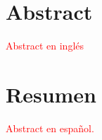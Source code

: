 \thispagestyle{plain}


\vspace{-30pt}
\section*{Abstract}

\textcolor{red}{Abstract en inglés}

\section*{Resumen}

\textcolor{red}{Abstract en español.}

\newpage
\thispagestyle{empty}

